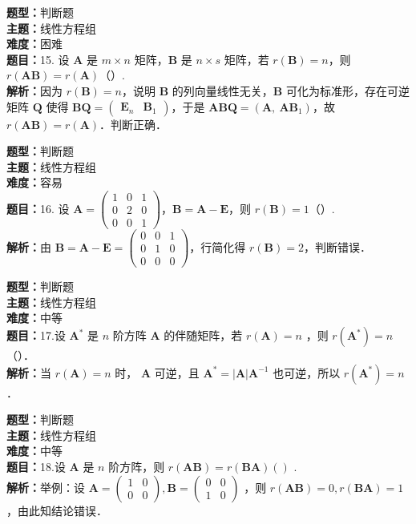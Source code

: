 \documentclass{ctexart}
\newenvironment{question}[5]{%
	\noindent\textbf{题型：}#1\\
	\textbf{主题：}#2\\
	\textbf{难度：}#3\\
	\textbf{题目：}#4\\
	\textbf{解析：}#5\\
	\vspace{1em}
}{}
\begin{document}
	\begin{question}
		{判断题}
		{线性方程组}
		{困难}
		{15. 设 \(\mathbf{A}\) 是 \(m \times n\) 矩阵，\(\mathbf{B}\) 是 \(n \times s\) 矩阵，若 \(r(\mathbf{B})=n\)，则 \(r(\mathbf{AB})=r(\mathbf{A})\)（）. }
		{因为 \(r(\mathbf{B})=n\)，说明 \(\mathbf{B}\) 的列向量线性无关，\(\mathbf{B}\) 可化为标准形，存在可逆矩阵 \(\mathbf{Q}\) 使得 \(\mathbf{B}\mathbf{Q} = \begin{pmatrix} \mathbf{E}_n & \mathbf{B}_1 \end{pmatrix}\)，于是 \(\mathbf{ABQ} = (\mathbf{A},\ \mathbf{AB}_1)\)，故 \(r(\mathbf{AB}) = r(\mathbf{A})\)．判断正确．}
	\end{question}
	
	\begin{question}
		{判断题}
		{线性方程组}
		{容易}
		{16. 设 \(\mathbf{A}=\begin{pmatrix}1 & 0 & 1 \\ 0 & 2 & 0 \\ 0 & 0 & 1\end{pmatrix}\)，\(\mathbf{B}=\mathbf{A}-\mathbf{E}\)，则 \(r(\mathbf{B})=1\)（）. }
		{由 \(\mathbf{B}=\mathbf{A}-\mathbf{E}=\begin{pmatrix}0 & 0 & 1 \\ 0 & 1 & 0 \\ 0 & 0 & 0\end{pmatrix}\)，行简化得 \(r(\mathbf{B})=2\)，判断错误．}
	\end{question}
	
	
	\begin{question}
		{判断题}
		{线性方程组}
		{中等}
		{17.设 \(\mathbf{A}^*\) 是 \(n\) 阶方阵 \(\mathbf{A}\) 的伴随矩阵，若 \(r(\mathbf{A})=n\) ，则 \(r\left(\mathbf{A}^*\right)=n\)（）．}
		{当 \(r(\mathbf{A})=n\) 时， \(\mathbf{A}\) 可逆，且 \(\mathbf{A}^*=|\mathbf{A}| \mathbf{A}^{-1}\) 也可逆，所以 \(r\left(\mathbf{A}^*\right)=n\) ．}
	\end{question}
	
	\begin{question}
		{判断题}
		{线性方程组}
		{中等}
		{18.设 \(\mathbf{A}\) 是 \(n\) 阶方阵，则 \(r(\mathbf{AB})=r(\mathbf{BA})()\) . }
		{举例：设 \(\mathbf{A}=\left(\begin{array}{ll}1 & 0 \\ 0 & 0\end{array}\right), \mathbf{B}=\left(\begin{array}{ll}0 & 0 \\ 1 & 0\end{array}\right)\) ，则 \(r(\mathbf{AB})=0, r(\mathbf{BA})=1\) ，由此知结论错误．}
	\end{question}
	
\end{document}
